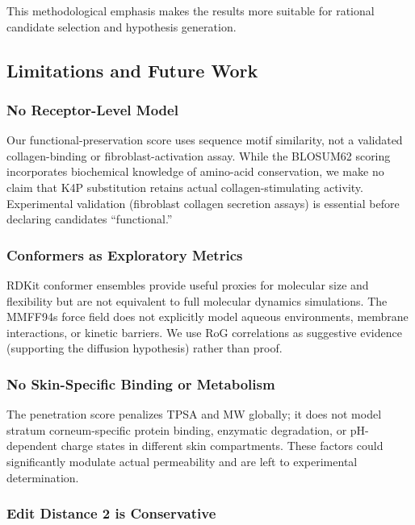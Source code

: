 \documentclass[11pt,a4paper]{article}
\begin{document}
This methodological emphasis makes the results more suitable for rational candidate selection and hypothesis generation.

\subsection{Limitations and Future Work}

\subsubsection{No Receptor-Level Model}

Our functional-preservation score uses sequence motif similarity, not a validated collagen-binding or fibroblast-activation assay. While the BLOSUM62 scoring incorporates biochemical knowledge of amino-acid conservation, we make no claim that K4P substitution retains actual collagen-stimulating activity. Experimental validation (fibroblast collagen secretion assays) is essential before declaring candidates ``functional.''

\subsubsection{Conformers as Exploratory Metrics}

RDKit conformer ensembles provide useful proxies for molecular size and flexibility but are not equivalent to full molecular dynamics simulations. The MMFF94s force field does not explicitly model aqueous environments, membrane interactions, or kinetic barriers. We use RoG correlations as suggestive evidence (supporting the diffusion hypothesis) rather than proof.

\subsubsection{No Skin-Specific Binding or Metabolism}

The penetration score penalizes TPSA and MW globally; it does not model stratum corneum-specific protein binding, enzymatic degradation, or pH-dependent charge states in different skin compartments. These factors could significantly modulate actual permeability and are left to experimental determination.

\subsubsection{Edit Distance 2 is Conservative}
\end{document}
